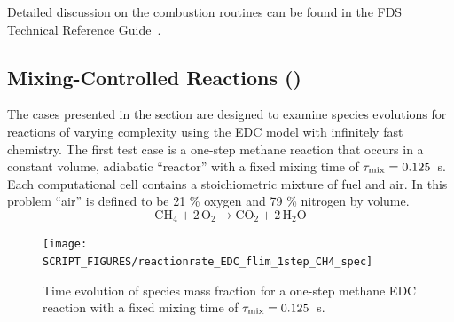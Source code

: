 \documentclass[11pt]{book}
\begin{document}
Detailed discussion on the combustion routines can be found in the FDS Technical Reference Guide~\cite{FDS_Tech_Guide}.

\subsection{Mixing-Controlled Reactions (\texorpdfstring{}{reactionrate\_EDC})}
\label{mixing_reactions}
\label{reactionrate_EDC_flim_1step_CH4}
\label{reactionrate_EDC_flim_1step_C3H8}
\label{reactionrate_EDC_1step_CH4_nonmix}
\label{reactionrate_EDC_O2lim_1step}
\label{reactionrate_EDC_O2lim_2fuel}
\label{reactionrate_series_reaction}
\label{reactionrate_EDC_flim_2step}
\label{reactionrate_lumped_two_air}

The cases presented in the section are designed to examine species evolutions for reactions of varying complexity using the EDC model with infinitely fast chemistry. The first test case is a one-step methane reaction that occurs in a constant volume, adiabatic ``reactor'' with a fixed mixing time of $\tau_{\rm mix}=0.125$~s. Each computational cell contains a stoichiometric mixture of fuel and air. In this problem ``air'' is defined to be 21 \% oxygen and 79 \% nitrogen by volume.
\begin{equation}\label{eq:1step_methane}
\mathrm{CH_4 + 2\, O_2 \rightarrow  CO_2 + 2\, H_2O}
\end{equation}

\begin{figure}[!ht]
\centering
\texttt{[image: SCRIPT\_FIGURES/reactionrate\_EDC\_flim\_1step\_CH4\_spec]}
\caption[Species evolution in a 1-step methane EDC reaction]{Time evolution of species mass fraction for a one-step methane EDC reaction with a fixed mixing time of $\tau_{\rm mix}=0.125$~s.}
\label{fig:EDC_1Step_meth_spec}
\end{figure}
\end{document}
